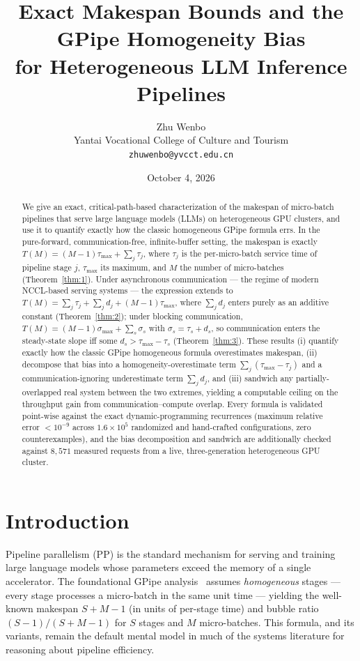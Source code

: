 \documentclass[11pt]{article}
\title{Exact Makespan Bounds and the GPipe Homogeneity Bias\\ for Heterogeneous LLM Inference Pipelines}
\author{Zhu Wenbo\\
        Yantai Vocational College of Culture and Tourism\\
        \texttt{zhuwenbo@yvcct.edu.cn}}
\date{October 4, 2026}
\begin{document}
\maketitle

\begin{abstract}
We give an exact, critical-path-based characterization of the makespan of micro-batch pipelines that serve large language models (LLMs) on heterogeneous GPU clusters, and use it to quantify exactly how the classic homogeneous GPipe formula errs. In the pure-forward, communication-free, infinite-buffer setting, the makespan is exactly $T(M)=(M-1)\tau_{\max}+\sum_j\tau_j$, where $\tau_j$ is the per-micro-batch service time of pipeline stage $j$, $\tau_{\max}$ its maximum, and $M$ the number of micro-batches (Theorem~\ref{thm:1}). Under asynchronous communication --- the regime of modern NCCL-based serving systems --- the expression extends to $T(M)=\sum_j\tau_j+\sum_j d_j+(M-1)\tau_{\max}$, where $\sum_j d_j$ enters purely as an additive constant (Theorem~\ref{thm:2}); under blocking communication, $T(M)=(M-1)\sigma_{\max}+\sum_s\sigma_s$ with $\sigma_s=\tau_s+d_s$, so communication enters the steady-state slope iff some $d_s>\tau_{\max}-\tau_s$ (Theorem~\ref{thm:3}). These results (i) quantify exactly how the classic GPipe homogeneous formula overestimates makespan, (ii) decompose that bias into a homogeneity-overestimate term $\sum_j(\tau_{\max}-\tau_j)$ and a communication-ignoring underestimate term $\sum_j d_j$, and (iii) sandwich any partially-overlapped real system between the two extremes, yielding a computable ceiling on the throughput gain from communication--compute overlap. Every formula is validated point-wise against the exact dynamic-programming recurrences (maximum relative error $<10^{-9}$ across $1.6\times10^{5}$ randomized and hand-crafted configurations, zero counterexamples), and the bias decomposition and sandwich are additionally checked against $8{,}571$ measured requests from a live, three-generation heterogeneous GPU cluster.
\end{abstract}

\section{Introduction}\label{sec:intro}

Pipeline parallelism (PP) is the standard mechanism for serving and training large language models whose parameters exceed the memory of a single accelerator. The foundational GPipe analysis~\cite{r1} assumes \emph{homogeneous} stages --- every stage processes a micro-batch in the same unit time --- yielding the well-known makespan $S+M-1$ (in units of per-stage time) and bubble ratio $(S-1)/(S+M-1)$ for $S$ stages and $M$ micro-batches. This formula, and its variants, remain the default mental model in much of the systems literature for reasoning about pipeline efficiency.
\end{document}
